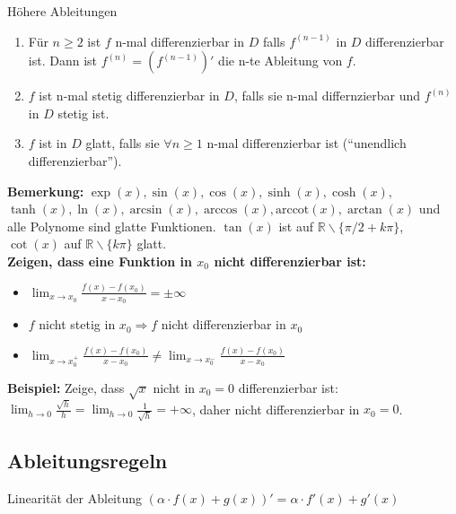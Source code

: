 \documentclass[a4paper,8pt]{extarticle}
\newenvironment{bemerkung}{
   \noindent \textbf{Bemerkung:  }}{}
\def\R{\mathbb{R}}
\begin{document}
\begin{mainbox}{Höhere Ableitungen}
 \begin{enumerate}
  \item Für $n \ge 2$ ist $f$ n-mal differenzierbar in $D$ falls $f^{(n-1)}$ in $D$ differenzierbar ist. Dann ist $f^{(n)} = (f^{(n-1)})'$ die n-te Ableitung von $f$.
  \item $f$ ist n-mal stetig differenzierbar in $D$, falls sie n-mal differnzierbar und $f^{(n)}$ in $D$ stetig ist.
  \item $f$ ist in $D$ glatt, falls sie $\forall n \ge 1$ n-mal differenzierbar ist (``unendlich differenzierbar'').
 \end{enumerate}
\end{mainbox}
\begin{bemerkung}
  $\exp(x), \sin(x), \cos(x), \sinh(x), \cosh(x),$ \\ $ \tanh(x), \ln(x), \arcsin(x), \arccos(x), \text{arccot}(x), \arctan(x)$ und alle Polynome sind glatte Funktionen. $\tan(x)$ ist auf $\R \backslash \{\pi/2 + k\pi\}$, $\cot(x)$ auf $\R \backslash \{k\pi\}$ glatt.
\end{bemerkung}
\\
\textbf{Zeigen, dass eine Funktion in $x_{0}$ nicht differenzierbar ist:}
\begin{itemize}
  \item $\lim _{x \rightarrow x_{0}} \frac{f(x)-f\left(x_{0}\right)}{x-x_{0}}=\pm \infty$
  \item $f$ nicht stetig in $x_{0} \Rightarrow f$ nicht differenzierbar in $x_{0}$
  \item $\lim _{x \rightarrow x_{0}^{+}} \frac{f(x)-f\left(x_{0}\right)}{x-x_{0}} \neq \lim _{x \rightarrow x_{0}^{-}} \frac{f(x)-f\left(x_{0}\right)}{x-x_{0}}$
\end{itemize}
\noindent\textbf{Beispiel:} Zeige, dass $\sqrt{x}$ nicht in $x_{0}=0$ differenzierbar ist: \\
$\lim _{h \rightarrow 0} \frac{\sqrt{h}}{h}=\lim _{h \rightarrow 0} \frac{1}{\sqrt{h}}=+\infty$, daher nicht differenzierbar in $x_{0}=0$.

\subsection{Ableitungsregeln}

\begin{subbox}{Linearität der Ableitung}
 $(\alpha \cdot f(x) + g(x))' = \alpha \cdot f'(x) + g'(x)$
\end{subbox}
\end{document}
